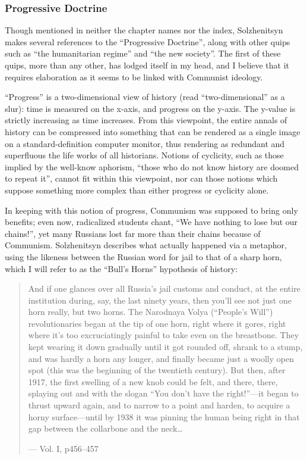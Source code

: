 \documentclass{article}
\begin{document}
\subsubsection{Progressive Doctrine}
Though mentioned in neither the chapter names nor the index, Solzhenitsyn makes several references to the ``Progressive Doctrine'', along with other quips such as ``the humanitarian regime'' and ``the new society''.  The first of these quips, more than any other, has lodged itself in my head, and I believe that it requires elaboration as it seems to be linked with Communist ideology.

``Progress'' is a two-dimensional view of history (read ``two-dimensional'' as a slur): time is measured on the x-axis, and progress on the y-axis.  The y-value is strictly increasing as time increases.  From this viewpoint, the entire annals of history can be compressed into something that can be rendered as a single image on a standard-definition computer monitor, thus rendering as redundant and superfluous the life works of all historians.  Notions of cyclicity, such as those implied by the well-know aphorism, ``those who do not know history are doomed to repeat it'', cannot fit within this viewpoint, nor can those notions which suppose something more complex than either progress or cyclicity alone.

In keeping with this notion of progress, Communism was supposed to bring only benefits; even now, radicalized students chant, ``We have nothing to lose but our chains!'', yet many Russians lost far more than their chains because of Communism.  Solzhenitsyn describes what actually happened via a metaphor, using the likeness between the Russian word for jail to that of a sharp horn, which I will refer to as the ``Bull's Horns'' hypothesis of history:

\begin{quote}
And if one glances over all Russia's jail customs and conduct, at the entire institution during, say, the last ninety years, then you'll see not just one horn really, but two horns.  The Narodnaya Volya (``People's Will'') revolutionaries began at the tip of one horn, right where it gores, right where it's too excruciatingly painful to take even on the breastbone.  They kept wearing it down gradually until it got rounded off, shrank to a stump, and was hardly a horn any longer, and finally became just a woolly open spot (this was the beginning of the twentieth century).  But then, after 1917, the first swelling of a new knob could be felt, and there, there, splaying out and with the slogan ``You don't have the right!''---it began to thrust upward again, and to narrow to a point and harden, to acquire a horny surface---until by 1938 it was pinning the human being right in that gap between the collarbone and the neck\ldots

--- Vol. I, p456--457
\end{quote}
\end{document}
